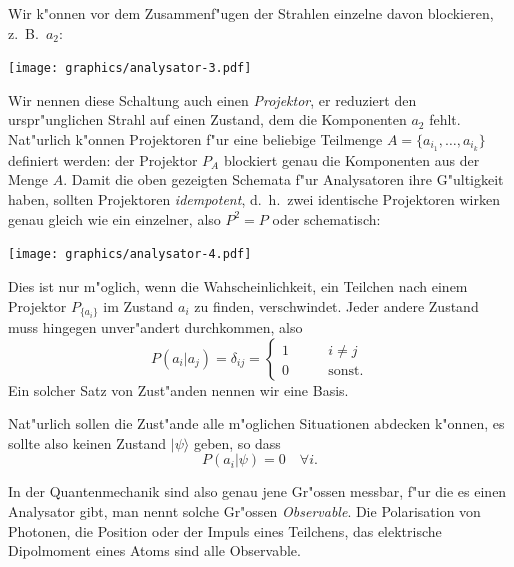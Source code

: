 Wir k"onnen vor dem Zusammenf"ugen der Strahlen einzelne davon
blockieren, z.~B.~$a_2$:
\begin{center}
\texttt{[image: graphics/analysator-3.pdf]}
\end{center}
Wir nennen diese Schaltung auch einen {\em Projektor}, er reduziert den
urspr"unglichen Strahl auf einen Zustand, dem die Komponenten $a_2$
fehlt. Nat"urlich k"onnen Projektoren f"ur eine beliebige Teilmenge
$A=\{a_{i_1},\dots, a_{i_k}\}$ definiert werden: der Projektor $P_A$
blockiert genau die Komponenten aus der Menge $A$.
Damit die oben gezeigten Schemata f"ur Analysatoren ihre G"ultigkeit
haben, sollten Projektoren {\em idempotent}, d.~h.~zwei identische 
Projektoren wirken genau gleich wie ein einzelner, also $P^2=P$ oder
schematisch:
\begin{center}
\texttt{[image: graphics/analysator-4.pdf]}
\end{center}

Dies ist nur m"oglich, wenn die Wahscheinlichkeit, ein Teilchen nach
einem Projektor $P_{\{a_i\}}$ im Zustand $a_i$ zu finden, verschwindet.
Jeder andere Zustand muss hingegen unver"andert durchkommen, also
\[
P(a_i|a_j)=\delta_{ij}=\begin{cases}
1&\qquad i\ne j\\
0&\qquad\text{sonst.}
\end{cases}
\]
Ein solcher Satz von Zust"anden nennen wir eine Basis.

Nat"urlich sollen die Zust"ande alle m"oglichen Situationen abdecken
k"onnen, es sollte also keinen Zustand $|\psi\rangle$ geben, so dass
\[
P(a_i|\psi)=0\quad\forall i.
\]

In der Quantenmechanik sind also genau jene Gr"ossen messbar, f"ur die
es einen Analysator gibt, man nennt solche Gr"ossen {\em Observable}.
Die Polarisation von Photonen, die Position oder der Impuls
eines Teilchens, das elektrische Dipolmoment eines Atoms sind alle
Observable.

